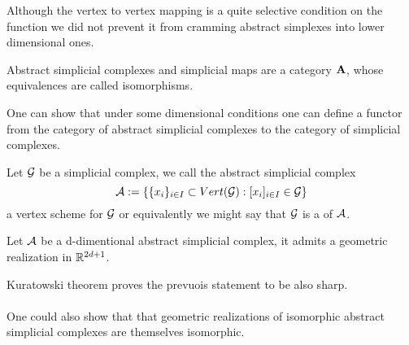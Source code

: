 \documentclass[../1.tex]{subfiles}
\begin{document}
    Although the vertex to vertex mapping is a quite selective condition on the function we did not prevent it from cramming
    abstract simplexes into lower dimensional ones.

    \begin{thm}
        Abstract simplicial complexes and simplicial maps are a category $\textbf{A}$, whose equivalences are called isomorphisms.
    \end{thm}

    One can show that under some dimensional conditions one can define a functor from the category of abstract simplicial complexes
    to the category of simplicial complexes.

    \begin{defn}
        Let $\mathcal{G}$ be a simplicial complex,  we call the abstract simplicial complex 
        \[ \mathcal{A} := \{ \{x_i\}_{i \in I} \subset Vert(\mathcal{G}) : [x_i]_{i \in I} \in \mathcal{G} \} \]
        a vertex scheme for $\mathcal{G}$ or equivalently we might say that $\mathcal{G}$ is a  of $\mathcal{A}$.
    \end{defn}

    \begin{thm}
        Let $\mathcal{A}$ be a d-dimentional abstract simplicial complex, it admits a geometric realization in $\mathbb{R}^{2d+1}$.
    \end{thm}
    Kuratowski theorem proves the prevuois statement to be also sharp.\\
    \hfill \\
    One could also show that that geometric realizations of isomorphic abstract simplicial complexes are themselves isomorphic.
\end{document}
